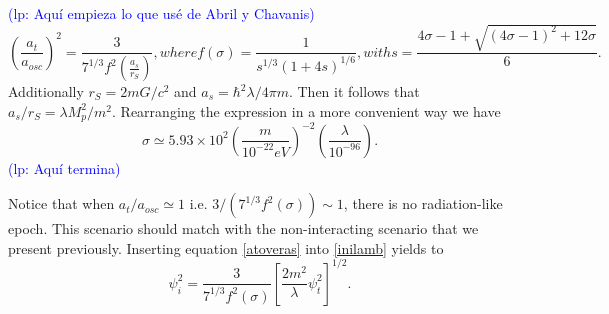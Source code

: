 \documentclass[amssymb,twocolumn,prd,nofootinbib,showpacs]{revtex4-1}
\newcommand{\lp}[1]{\textcolor{blue}{(lp: #1)}}
\begin{document}
\begin{itemize}
\lp{Aqu\'i empieza lo que us\'e de Abril y Chavanis}
\begin{subequations}
\begin{equation}\label{atoveras}
\left(\frac{a_t}{a_{osc}}\right)^2=\frac{3}{7^{1/3}f^2(\frac{a_s}{r_S})},
\end{equation}
where 
\begin{equation}
f(\sigma)=\frac{1}{s^{1/3}(1+4s)^{1/6}},
\end{equation}
with
\begin{equation}
s=\frac{4\sigma-1+\sqrt{(4\sigma-1)^2+12\sigma}}{6}.
\end{equation}
\end{subequations}
%
Additionally $r_S=2mG/c^2$ and $a_s=\hbar^2\lambda/4\pi m$. 
Then it follows that $a_s/r_S=\lambda M_p^2/m^2$. 
Rearranging the expression in a more convenient way we have
\begin{equation}
\sigma \simeq 5.93\times 10^{
2}\left(\frac{m}{10^{-22}eV}\right)^{-2}\left(\frac{\lambda}{10^{-96}}\right).
\end{equation}
\lp{Aqu\'i termina}

%
Notice that when $a_t/a_{osc}\simeq 1$ i.e.  $3/(7^{1/3}f^2(\sigma))\sim 1$, there is no radiation-like epoch. 
This scenario should match with the non-interacting scenario that we present previously.  Inserting equation \eqref{atoveras} into \eqref{inilamb} yields to
\begin{equation}\label{inilamb2}
\psi_i^2=\frac{3}{7^{1/3}f^2(\sigma)}\left[\frac{2m^2}{\lambda}\psi_t^2\right]^{1/2}.
\end{equation}
%


\end{itemize}
\end{document}

